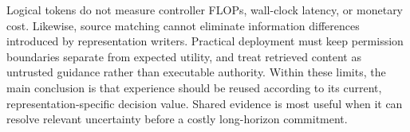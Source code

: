 \documentclass[sigconf,anonymous,review]{acmart}
\theoremstyle{zhplain}
\begin{document}
Logical tokens do not measure controller FLOPs, wall-clock latency, or monetary cost. Likewise, source matching cannot eliminate information differences introduced by representation writers. Practical deployment must keep permission boundaries separate from expected utility, and treat retrieved content as untrusted guidance rather than executable authority. Within these limits, the main conclusion is that experience should be reused according to its current, representation-specific decision value. Shared evidence is most useful when it can resolve relevant uncertainty before a costly long-horizon commitment.


\label{maintext:end}
\clearpage
\end{document}
